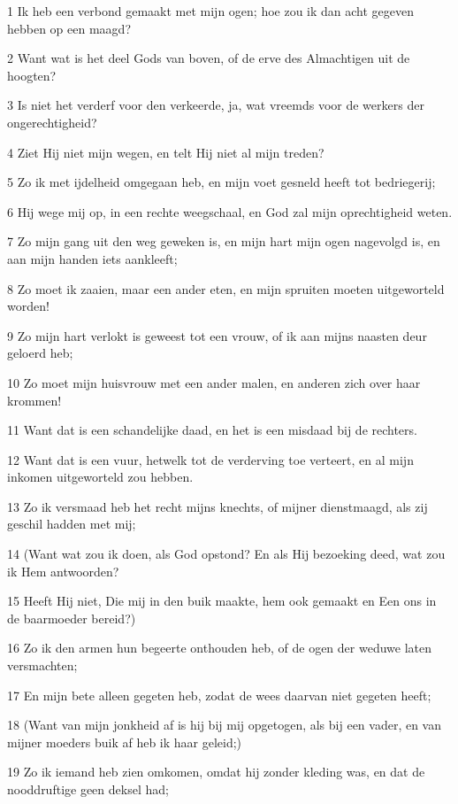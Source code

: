 \par 1 Ik heb een verbond gemaakt met mijn ogen; hoe zou ik dan acht gegeven hebben op een maagd?
\par 2 Want wat is het deel Gods van boven, of de erve des Almachtigen uit de hoogten?
\par 3 Is niet het verderf voor den verkeerde, ja, wat vreemds voor de werkers der ongerechtigheid?
\par 4 Ziet Hij niet mijn wegen, en telt Hij niet al mijn treden?
\par 5 Zo ik met ijdelheid omgegaan heb, en mijn voet gesneld heeft tot bedriegerij;
\par 6 Hij wege mij op, in een rechte weegschaal, en God zal mijn oprechtigheid weten.
\par 7 Zo mijn gang uit den weg geweken is, en mijn hart mijn ogen nagevolgd is, en aan mijn handen iets aankleeft;
\par 8 Zo moet ik zaaien, maar een ander eten, en mijn spruiten moeten uitgeworteld worden!
\par 9 Zo mijn hart verlokt is geweest tot een vrouw, of ik aan mijns naasten deur geloerd heb;
\par 10 Zo moet mijn huisvrouw met een ander malen, en anderen zich over haar krommen!
\par 11 Want dat is een schandelijke daad, en het is een misdaad bij de rechters.
\par 12 Want dat is een vuur, hetwelk tot de verderving toe verteert, en al mijn inkomen uitgeworteld zou hebben.
\par 13 Zo ik versmaad heb het recht mijns knechts, of mijner dienstmaagd, als zij geschil hadden met mij;
\par 14 (Want wat zou ik doen, als God opstond? En als Hij bezoeking deed, wat zou ik Hem antwoorden?
\par 15 Heeft Hij niet, Die mij in den buik maakte, hem ook gemaakt en Een ons in de baarmoeder bereid?)
\par 16 Zo ik den armen hun begeerte onthouden heb, of de ogen der weduwe laten versmachten;
\par 17 En mijn bete alleen gegeten heb, zodat de wees daarvan niet gegeten heeft;
\par 18 (Want van mijn jonkheid af is hij bij mij opgetogen, als bij een vader, en van mijner moeders buik af heb ik haar geleid;)
\par 19 Zo ik iemand heb zien omkomen, omdat hij zonder kleding was, en dat de nooddruftige geen deksel had;
